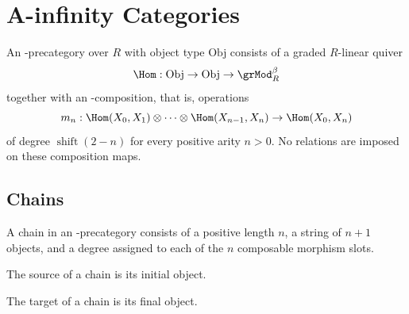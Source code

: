 
\chapter{A-infinity Categories}

\begin{definition}
\label{AInfinityTheory.AInfinityCategoryStruct}
\leanok
{}
An \Ainf{}-precategory over $R$ with object type $\mathrm{Obj}$ consists of a
graded $R$-linear quiver
\[
  \Hom : \mathrm{Obj} \to \mathrm{Obj} \to \grMod_R^\beta
\]
together with an \Ainf{}-composition, that is, operations
\[
  m_n : \Hom(X_0, X_1) \otimes \dots \otimes \Hom(X_{n-1}, X_n) \to \Hom(X_0, X_n)
\]
of degree $\operatorname{shift}(2-n)$ for every positive arity $n>0$. No relations
are imposed on these composition maps.
\end{definition}

\section{Chains}

\begin{definition}[Chain]
\label{AInfinityCategoryTheory.AInfinityPreCategory.Chain}
{}
A chain in an \Ainf{}-precategory consists of a positive length $n$, a string of
$n+1$ objects, and a degree assigned to each of the $n$ composable morphism
slots.
\end{definition}

\begin{definition}[Chain source]
\label{AInfinityCategoryTheory.AInfinityPreCategory.Chain.source}
{}
The source of a chain is its initial object.
\end{definition}

\begin{definition}[Chain target]
\label{AInfinityCategoryTheory.AInfinityPreCategory.Chain.target}
{}
The target of a chain is its final object.
\end{definition}


